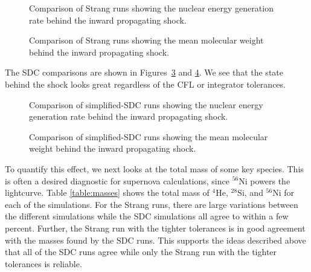 \documentclass{aastex63}
\newcommand{\isot}[2]{$^{#2}\mathrm{#1}$}
\begin{document}
\begin{figure}
\caption{\label{fig:strang_enuc_summary} Comparison of Strang runs showing
the nuclear energy generation rate behind the inward propagating
shock.}
\end{figure}

\begin{figure}
\caption{\label{fig:strang_abar_summary} Comparison of Strang runs showing
the mean molecular weight behind the inward propagating
shock.}
\end{figure}

The SDC comparisons are shown in Figures~\ref{fig:sdc_enuc_summary}
and \ref{fig:sdc_abar_summary}.  We see that the state behind the
shock looks great regardless of the CFL or integrator tolerances.

\begin{figure}
\caption{\label{fig:sdc_enuc_summary} Comparison of simplified-SDC runs showing
the nuclear energy generation rate behind the inward propagating
shock.}
\end{figure}

\begin{figure}
\caption{\label{fig:sdc_abar_summary} Comparison of simplified-SDC runs showing
the mean molecular weight behind the inward propagating
shock.}
\end{figure}


To quantify this effect, we next looks at the total mass of some key
species.  This is often a desired diagnostic for supernova
calculations, since \isot{Ni}{56} powers the lightcurve.  Table
\ref{table:masses} shows the total mass of \isot{He}{4},
\isot{Si}{28}, and \isot{Ni}{56} for each of the simulations.  For the
Strang runs, there are large variations between the different
simulations while the SDC simulations all agree to within a few
percent.  Further, the Strang run with the tighter tolerances is in
good agreement with the masses found by the SDC runs.  This supports
the ideas described above that all of the SDC runs agree while only
the Strang run with the tighter tolerances is reliable.
\end{document}
